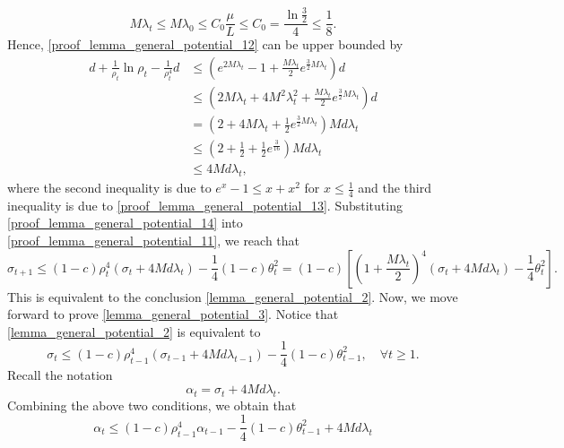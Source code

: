 \documentclass[11pt]{article}
\numberwithin{assumption}{section}
\numberwithin{remark}{section}
\numberwithin{theorem}{section}
\begin{document}
\begin{equation}\label{proof_lemma_general_potential_13}
M\lambda_t \leq M\lambda_0 \leq C_0\frac{\mu}{L} \leq C_0 = \frac{\ln{\frac{3}{2}}}{4} \leq \frac{1}{8}.
\end{equation}
Hence, \eqref{proof_lemma_general_potential_12} can be upper bounded by
\begin{equation}\label{proof_lemma_general_potential_14}
\begin{split}
    d + \frac{1}{\rho_t}\ln{\rho_t} - \frac{1}{\rho_t^4}d & \leq (e^{2M\lambda_t} - 1 + \frac{M\lambda_t}{2}e^{\frac{3}{2}M\lambda_t})d\\
    & \leq (2M\lambda_t + 4M^2\lambda_t^2 + \frac{M\lambda_t}{2}e^{\frac{3}{2}M\lambda_t})d\\
    & = (2 + 4M\lambda_t + \frac{1}{2}e^{\frac{3}{2}M\lambda_t})Md\lambda_t\\
    & \leq (2 + \frac{1}{2} + \frac{1}{2}e^{\frac{3}{16}})Md\lambda_t\\
    & \leq 4Md\lambda_t,
\end{split}
\end{equation}
where the second inequality is due to $e^x - 1 \leq x + x^2$ for $x \leq \frac{1}{4}$ and the third inequality is due to \eqref{proof_lemma_general_potential_13}. Substituting \eqref{proof_lemma_general_potential_14} into \eqref{proof_lemma_general_potential_11}, we reach that
\begin{equation}
    \sigma_{t + 1} \leq (1 - c)\rho_t^4(\sigma_t + 4Md\lambda_t) - \frac{1}{4}(1 - c)\theta_t^2 = (1 - c)\left[(1 + \frac{M\lambda_t}{2})^4(\sigma_t + 4Md\lambda_t) - \frac{1}{4}\theta_t^2\right].
\end{equation}
This is equivalent to the conclusion \eqref{lemma_general_potential_2}. Now, we move forward to prove \eqref{lemma_general_potential_3}. Notice that \eqref{lemma_general_potential_2} is equivalent to
\begin{equation}
\sigma_{t} \leq (1 - c)\rho_{t - 1}^4(\sigma_{t - 1} + 4Md\lambda_{t - 1}) - \frac{1}{4}(1 - c)\theta_{t - 1}^2, \quad \forall t \geq 1.
\end{equation}
Recall the notation
\begin{equation}
    \alpha_t = \sigma_{t} + 4Md\lambda_t.
\end{equation}
Combining the above two conditions, we obtain that
\begin{equation}\label{proof_lemma_general_potential_15}
    \alpha_t \leq (1 - c)\rho_{t - 1}^4 \alpha_{t - 1} - \frac{1}{4}(1 - c)\theta_{t - 1}^2 + 4Md\lambda_t
\end{equation}
\end{document}
